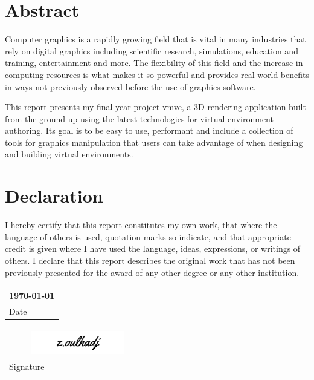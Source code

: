 \documentclass[11pt]{article}
\begin{document}
\pagebreak

\section*{Abstract}
Computer graphics is a rapidly growing field that is vital in many industries
that rely on digital graphics including scientific research, simulations,
education and training, entertainment and more. The flexibility of this field
and the increase in computing resources is what makes it so powerful and
provides real-world benefits in ways not previously observed before the use of
graphics software.

This report presents my final year project \gls{vmve}, a 3D rendering
application built from the ground up using the latest technologies for virtual
environment authoring. Its goal is to be easy to use, performant and include a
collection of tools for graphics manipulation that users can take advantage of
when designing and building virtual environments.


\pagebreak

\section*{Declaration}
I hereby certify that this report constitutes my own work, that where
the language of others is used, quotation marks so indicate, and that
appropriate credit is given where I have used the language, ideas,
expressions, or writings of others. I declare that this report
describes the original work that has not been previously presented for
the award of any other degree or any other institution.

\noindent
\begin{tabular}[b]{@{} p{6cm} @{}}
\today \\
\hline
\scriptsize Date
\end{tabular}\qquad
\begin{tabular}[b]{@{} p{6cm} @{}}
\includegraphics[width=6cm,height=1cm]{images/signature.png} \\
\hline
\scriptsize Signature
\end{tabular}



\pagebreak
\tableofcontents
{}
\pagebreak
\end{document}
